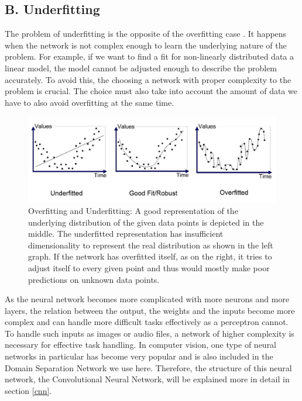 \subsection*{B. Underfitting}
The problem of underfitting is the opposite of the overfitting case \cite{underoverfitting}. It happens when the network is not complex enough to learn the underlying nature of the problem. For example, if we want to find a fit for non-linearly distributed data a linear model, the model cannot be adjusted enough to describe the problem accurately. To avoid this, the choosing a network with proper complexity to the problem is crucial. The choice must also take into account the amount of data we have to also avoid overfitting at the same time. 

\begin{figure}[tbh]
  \centering
    \includegraphics[width=\textwidth]{abbildungen/overunderfitting.png}
  \caption{Overfitting and Underfitting: A good representation of the underlying distribution of the given data points is depicted in the middle. The underfitted representation has insufficient dimensionality to represent the real distribution as shown in the left graph. If the network has overfitted itself, as on the right, it tries to adjust itself to every given point and thus would mostly make poor predictions on unknown data points.} 
  \label{fig:underoverfitting}
\end{figure}

As the neural network becomes more complicated with more neurons and more layers, the relation between the output, the weights and the inputs become more complex and can handle more difficult tasks effectively as a perceptron cannot. To handle such inputs as images or audio files, a network of higher complexity is necessary for effective task handling. In computer vision, one type of neural networks in particular has become very popular and is also included in the Domain Separation Network we use here. Therefore, the structure of this neural network, the Convolutional Neural Network, will be explained more in detail in section \ref{cnn}.


